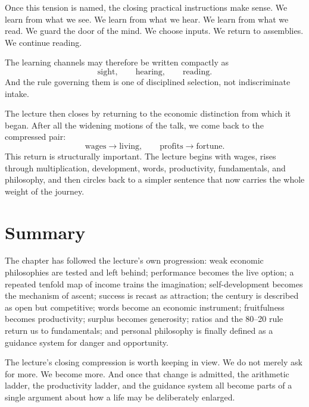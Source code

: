Once this tension is named, the closing practical instructions make sense. We learn from what we see. We learn from what we hear. We learn from what we read. We guard the door of the mind. We choose inputs. We return to assemblies. We continue reading.

The learning channels may therefore be written compactly as
\begin{equation}
\text{sight}, \qquad \text{hearing}, \qquad \text{reading}.
\end{equation}
And the rule governing them is one of disciplined selection, not indiscriminate intake.

The lecture then closes by returning to the economic distinction from which it began. After all the widening motions of the talk, we come back to the compressed pair:
\begin{equation}
\text{wages} \to \text{living}, \qquad \text{profits} \to \text{fortune}.
\end{equation}
This return is structurally important. The lecture begins with wages, rises through multiplication, development, words, productivity, fundamentals, and philosophy, and then circles back to a simpler sentence that now carries the whole weight of the journey.

\section{Summary}

The chapter has followed the lecture's own progression: weak economic philosophies are tested and left behind; performance becomes the live option; a repeated tenfold map of income trains the imagination; self-development becomes the mechanism of ascent; success is recast as attraction; the century is described as open but competitive; words become an economic instrument; fruitfulness becomes productivity; surplus becomes generosity; ratios and the 80--20 rule return us to fundamentals; and personal philosophy is finally defined as a guidance system for danger and opportunity.

The lecture's closing compression is worth keeping in view. We do not merely ask for more. We become more. And once that change is admitted, the arithmetic ladder, the productivity ladder, and the guidance system all become parts of a single argument about how a life may be deliberately enlarged.